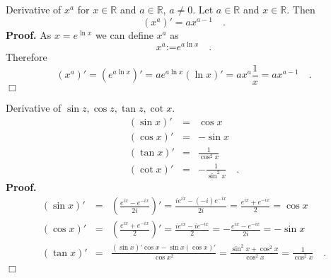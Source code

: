 \documentclass[12pt]{book}
\newcommand{\eqdef}{\textbf{:=}}
\newenvironment{proof}[1][]{ \textbf{Proof#1.} }{$\Box$\medskip}
\begin{document}
Derivative of $x^a$ for $x\in \mathbb R$ and $a\in \mathbb R$, $a\neq 0$. Let $a\in \mathbb R$ and $x\in \mathbb R$. Then
\begin{equation}\label{eqXtotheAthDerivative}
(x^a)'=ax^{a-1}\quad .
\end{equation}
\begin{proof} As $x=e^{\ln x}$ we can define $x^a$ as
\[
x^a\eqdef  e^{a\ln x}\quad .
\]
Therefore 
\[
(x^{a})'=(e^{a\ln x})'=ae^{a\ln x} (\ln x)' =a x^{a}\frac{1}{x} = ax^{a-1} \quad .
\]
\end{proof}

Derivative of $\sin z, \cos z, \tan z, \cot x$.
\[
\begin{array}{rcl}
(\sin x)'&=&\cos x\\
(\cos x)'&=&-\sin x\\
(\tan x)'&=&\frac{1}{\cos ^2 x}\\
(\cot x)'&=&-\frac{1}{\sin ^2 x}\quad .
\end{array}
\]
\begin{proof}
\[
\begin{array}{rcl}
(\sin x)'&=&\left(\frac{e^{ix}-e^{-ix}}{2i}\right)'=\frac{ie^{ix}-(-i)e^{-ix}}{2i}=\frac{e^{ix}+e^{-ix}}2=\cos x\\
(\cos x)'&=&\left(\frac{e^{ix}+e^{-ix}}{2}\right)'=\frac{ie^{ix}-ie^{-ix}}{2}=-\frac{e^{ix}-e^{-ix}}{2i}=-\sin x \\
(\tan x)'&=&\frac{(\sin x)'\cos x- \sin x (\cos x)'}{\cos x^{2}}=\frac{\sin^2x+\cos^2x}{\cos^2x}=\frac{1}{\cos^2x} \quad .\\
\end{array}
\]
\end{proof}
\end{document}
